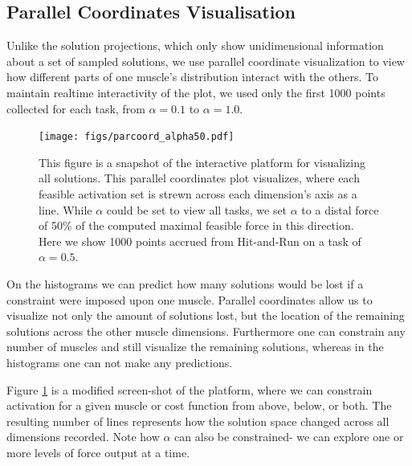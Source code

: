 \subsection{Parallel Coordinates Visualisation}
Unlike the solution projections, which only show unidimensional information about a set of sampled solutions, we use parallel coordinate visualization to view how different parts of one muscle's distribution interact with the others.
To maintain realtime interactivity of the plot, we used only the first 1000 points collected for each task, from $\alpha = 0.1$ to $\alpha = 1.0$.

\begin{figure}[htbp]
\centering
\texttt{[image: figs/parcoord\_alpha50.pdf]}
\caption{This figure is a snapshot of the interactive platform for visualizing all solutions. This parallel coordinates plot visualizes, where each feasible activation set is strewn across each dimension's axis as a line. While $\alpha$ could be set to view all tasks, we set $\alpha$ to a distal force of 50\% of the computed maximal feasible force in this direction. Here we show 1000 points accrued from Hit-and-Run on a task of $\alpha=0.5$.}
\label{fig:parcoord_full}
\end{figure}

On the histograms we can predict how many solutions would be lost if a constraint were imposed upon one muscle.
Parallel coordinates allow us to visualize not only the amount of solutions lost, but the location of the remaining solutions across the other muscle dimensions.
Furthermore one can constrain any number of muscles and still visualize the remaining solutions, whereas in the histograms one can not make any predictions.

Figure \ref{fig:parcoord_full} is a modified screen-shot of the platform, where we can constrain activation for a given muscle or cost function from above, below, or both.
The resulting number of lines represents how the solution space changed across all dimensions recorded.
Note how $\alpha$ can also be constrained- we can explore one or more levels of force output at a time.

